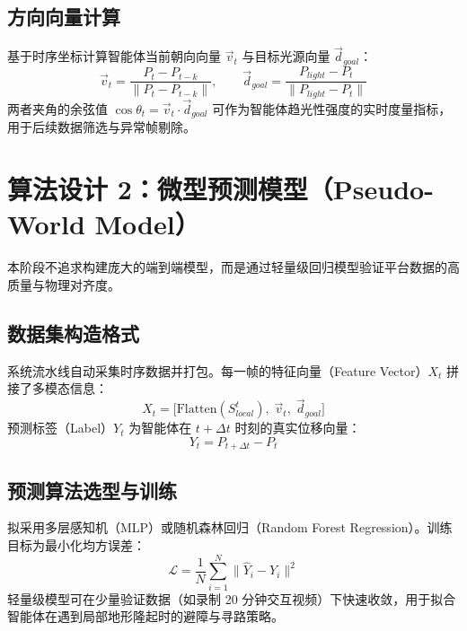 \documentclass[a4paper,11pt]{ctexart}
\begin{document}
\begin{samepage}
\subsection{方向向量计算}
基于时序坐标计算智能体当前朝向向量 $\vec{v}_t$ 与目标光源向量 $\vec{d}_{goal}$：
\begin{equation}
    \vec{v}_t = \frac{P_t - P_{t-k}}{\|P_t - P_{t-k}\|}, \qquad
    \vec{d}_{goal} = \frac{P_{light} - P_t}{\|P_{light} - P_t\|}
\end{equation}
两者夹角的余弦值 $\cos\theta_t = \vec{v}_t \cdot \vec{d}_{goal}$ 可作为智能体趋光性强度的实时度量指标，用于后续数据筛选与异常帧剔除。
\end{samepage}

\section{算法设计 2：微型预测模型（Pseudo-World Model）}

本阶段不追求构建庞大的端到端模型，而是通过轻量级回归模型验证平台数据的高质量与物理对齐度。

\begin{samepage}
\subsection{数据集构造格式}
系统流水线自动采集时序数据并打包。每一帧的特征向量（Feature Vector）$X_t$ 拼接了多模态信息：
\begin{equation}
    X_t = \Big[ \text{Flatten}(S_{local}^t),\; \vec{v}_t,\; \vec{d}_{goal} \Big]
\end{equation}
预测标签（Label）$Y_t$ 为智能体在 $t+\Delta t$ 时刻的真实位移向量：
\begin{equation}
    Y_t = P_{t+\Delta t} - P_t
\end{equation}

\subsection{预测算法选型与训练}
拟采用多层感知机（MLP）或随机森林回归（Random Forest Regression）。训练目标为最小化均方误差：
\begin{equation}
    \mathcal{L} = \frac{1}{N} \sum_{i=1}^{N} \| \hat{Y}_i - Y_i \|^2
\end{equation}
轻量级模型可在少量验证数据（如录制 20 分钟交互视频）下快速收敛，用于拟合智能体在遇到局部地形隆起时的避障与寻路策略。
\end{samepage}
\end{document}
